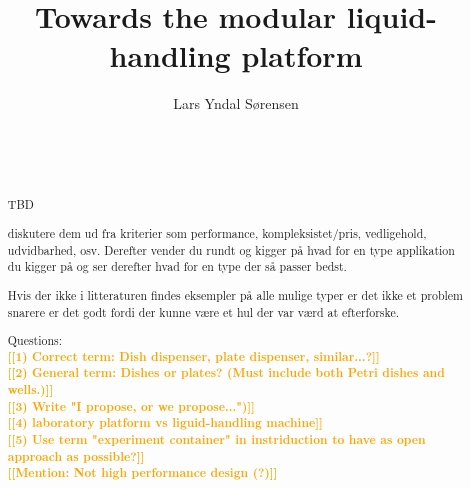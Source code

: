 \documentclass{sigchi}
\newcommand{\todo}[1]{\textsf{\textbf{\textcolor{Orange}{[[#1]]}}}}
\begin{document}
	
	\title{Towards the modular liquid-handling platform}
	
	\author{
		\alignauthor Lars Yndal Sørensen\\
		\\
		\\
		\\
	}
	
	\maketitle
	
	\begin{abstract}
		TBD
		
		diskutere dem ud 
		fra kriterier som performance, kompleksistet/pris, vedligehold, udvidbarhed,
		osv. Derefter vender du rundt og kigger på hvad for en type applikation 
		du kigger på og ser derefter hvad for en type der så passer bedst.
		
		Hvis der ikke i litteraturen findes eksempler på alle mulige typer er det
		ikke et problem snarere er det godt fordi der kunne være et hul der
		var værd at efterforske.
		
		Questions:\\
			\todo{1) Correct term: Dish dispenser, plate dispenser, similar...?}\\
			\todo{2) General term: Dishes or plates? (Must include both Petri dishes and wells.)}\\
			\todo{3) Write "I propose, or we propose...")}\\
			\todo{4) laboratory platform vs liguid-handling machine}\\
			\todo{5) Use term "experiment container" in instriduction to have as open approach as possible?}\\
			\todo{Mention: Not high performance design (?)}
			
	\end{abstract}
	
	
	
\end{document}
